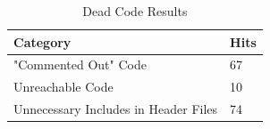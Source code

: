 \begin{table}[]
\centering
\caption{Dead Code Results}
\label{tab:deadCode}
\begin{tabular}{|l|l|}
\hline
\textbf{Category}		& 	\textbf{Hits} \\ \hline
"Commented Out" Code 			&	67  \\ \hline
Unreachable Code 	& 	10	 \\ \hline
Unnecessary Includes in Header Files 	& 	74	 \\ \hline
\end{tabular}
\end{table}









































